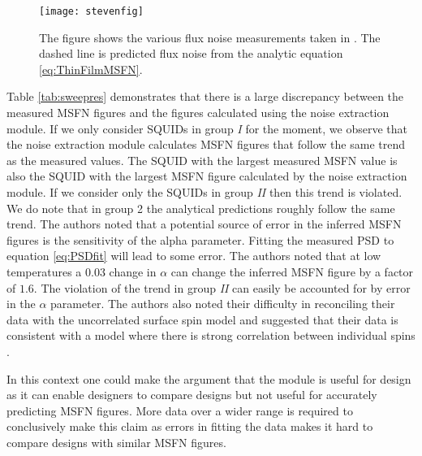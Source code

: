\begin{figure}[h]
    \centering
    \texttt{[image: stevenfig]}
    \caption{The figure shows the various flux noise measurements taken in \cite{fluxNoiseSquidsStevenAnton}. The dashed line is predicted flux noise from the analytic equation \ref{eq:ThinFilmMSFN}.}
    \label{fig:stevefig}
\end{figure}

Table \ref{tab:sweepres} demonstrates that there is a large discrepancy between the measured MSFN figures and the figures calculated using the noise extraction module. If we only consider SQUIDs in group \textit{I} for the moment, we observe that the noise extraction module calculates MSFN figures that follow the same trend as the measured values. The SQUID with the largest measured MSFN value is also the SQUID with the largest MSFN figure calculated by the noise extraction module. If we consider only the SQUIDs in group \textit{II} then this trend is violated. We do note that in group 2 the analytical predictions roughly follow the same trend. The authors noted that a potential source of error in the inferred MSFN figures is the sensitivity of the alpha parameter. Fitting the measured PSD to equation \ref{eq:PSDfit} will lead to some error. The authors noted that at low temperatures a $0.03$ change in $\alpha$ can change the inferred MSFN figure by a factor of $1.6$. The violation of the trend in group \textit{II} can easily be accounted for by error in the $\alpha$ parameter. The authors also noted their difficulty in reconciling their data with the uncorrelated surface spin model and suggested that their data is consistent with a model where there is strong correlation between individual spins \cite{fluxNoiseSquidsStevenAnton}. \par
In this context one could make the argument that the module is useful for design as it can enable designers to compare designs but not useful for accurately predicting MSFN figures. More data over a wider range is required to conclusively make this claim as errors in fitting the data makes it hard to compare designs with similar MSFN figures.